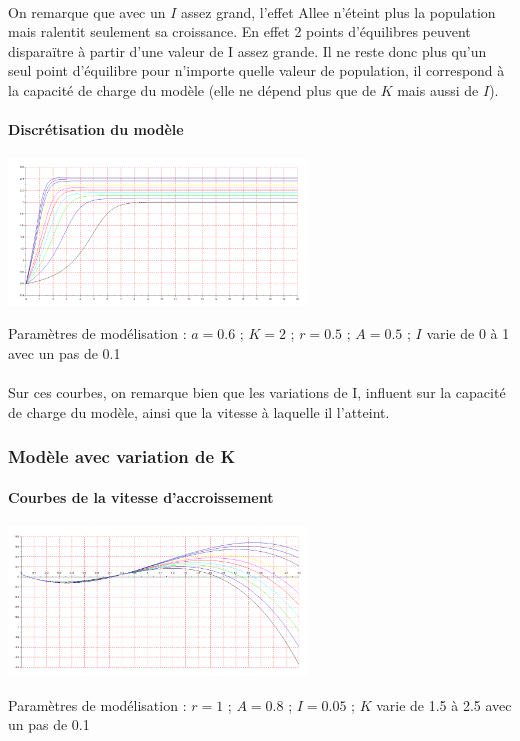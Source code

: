 \documentclass{article}
\begin{document}
\paragraph{}
On remarque que avec un $I$ assez grand, l'effet Allee n'éteint plus la population mais ralentit seulement sa croissance. En effet 2 points d'équilibres peuvent disparaïtre à partir d'une valeur de I assez grande. Il ne reste donc plus qu'un seul point d'équilibre pour n'importe quelle valeur de population, il correspond à la capacité de charge du modèle (elle ne dépend plus que de $K$ mais aussi de $I$).
\newpage

\paragraph{Discrétisation du modèle}
\begin{center}
\includegraphics[width=300px]{img/part1/TrajI.png}
\end{center}
Paramètres de modélisation : $a=0.6$ ; $K=2$  ; $r=0.5$ ; $A=0.5$ ; $I$ varie de 0 à 1 avec un pas de 0.1
\paragraph{}
Sur ces courbes, on remarque bien que les variations de I, influent sur la capacité de charge du modèle, ainsi que la vitesse à laquelle il l'atteint.

\subsubsection{Modèle avec variation de K}

\paragraph{Courbes de la vitesse d'accroissement}
\begin{center}
\includegraphics[width=300px]{img/part1/AlleeK.png}
\end{center}
Paramètres de modélisation : $r=1$ ; $A=0.8$ ; $I=0.05$ ; $K$ varie de 1.5 à 2.5 avec un pas de 0.1
\end{document}
